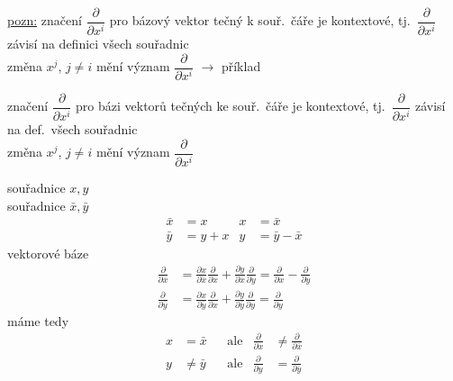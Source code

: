 \underline{pozn:} značení $\dfrac{\partial}{\partial x^i}$ pro bázový vektor tečný k souř.\ čáře je kontextové, tj.\ $\dfrac{\partial}{\partial x^i}$ závisí na definici všech souřadnic \\
\quad změna $x^j$, $j\neq i$ mění význam $\dfrac{\partial}{\partial x^i}$ \quad $\to$ příklad

značení $\dfrac{\partial}{\partial x^i}$ pro bázi vektorů tečných ke souř.\ čáře je kontextové, tj.\ $\dfrac{\partial}{\partial x^i}$ závisí na def.\ všech souřadnic \\
změna $x^j$, $j\neq i$ mění význam $\dfrac{\partial}{\partial x^i}$

\begin{priklad}[Př: $\mathbb{R}^2$]
\begin{minipage}[t]{0.55\linewidth}
souřadnice $x, y$ \\
souřadnice $\bar x, \bar y$
\begin{align*}
  \bar x &= x & x &= \bar x \\
  \bar y &= y + x & y &= \bar y - \bar x
\end{align*}
vektorové báze
\begin{align*}
  \frac{\partial}{\partial\bar x} &= \frac{\partial x}{\partial\bar x}\frac{\partial}{\partial x} + \frac{\partial y}{\partial\bar x}\frac{\partial}{\partial y} = \frac{\partial}{\partial x} - \frac{\partial}{\partial y} \\
  \frac{\partial}{\partial\bar y} &= \frac{\partial x}{\partial\bar y}\frac{\partial}{\partial x} + \frac{\partial y}{\partial\bar y}\frac{\partial}{\partial y} = \frac{\partial}{\partial y}
\end{align*}
máme tedy
\begin{align*}
  x &= \bar x & &\text{ale} & \frac{\partial}{\partial x} &\neq \frac{\partial}{\partial\bar x} \\
  y &\neq \bar y & &\text{ale} & \frac{\partial}{\partial y} &= \frac{\partial}{\partial\bar y}
\end{align*}
\end{minipage}\hfill
\begin{minipage}[t]{0.42\linewidth}
\centering
{}
\end{minipage}
\end{priklad}
